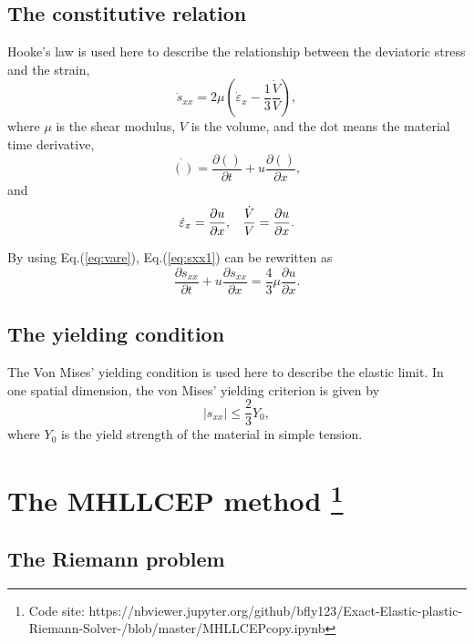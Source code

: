 \documentclass[review]{elsarticle}
\begin{document}
\subsection{The constitutive relation}
Hooke's law is used here to describe the relationship between the deviatoric stress and the strain,
\begin{equation}\label{eq:sxx1}
\dot{s}_{xx} = 2\mu \left(\dot{\varepsilon}_x-\frac{1}{3}\frac{\dot{V}}{V}\right),
\end{equation}
where $\mu$ is the shear modulus, $V$ is the volume, and the dot means the material time derivative,
\begin{equation}\label{eq:mt}
  \dot{()} = \frac{\partial ()}{\partial t} + u \frac{\partial ()}{\partial x},
\end{equation}
and
\begin{equation}\label{eq:vare}
  \dot{\varepsilon}_x = \frac{\partial u}{\partial x}, \hspace{0.3cm} \frac{\dot{V}}{V} = \frac{\partial u}{\partial x}.
\end{equation}

By using Eq.(\ref{eq:vare}), Eq.(\ref{eq:sxx1}) can be rewritten as
\begin{equation}\label{eq:sxx}
  \frac{\partial s_{xx}}{\partial t} + u \frac{\partial s_{xx}}{\partial x} =\frac{4}{3}\mu \frac{\partial u}{\partial x}.
\end{equation}

\subsection{The yielding condition}
The Von Mises' yielding condition is used here to describe the elastic limit. In one spatial dimension, the von Mises' yielding criterion is given by
\begin{equation}
  |s_{xx}| \le \frac{2}{3}Y_0,
\end{equation}
where $Y_0$ is the yield strength of the material in simple tension.

  
\section{The MHLLCEP method  \footnote{Code site: https://nbviewer.jupyter.org/github/bfly123/Exact-Elastic-plastic-Riemann-Solver-/blob/master/MHLLCEPcopy.ipynb}}\label{sec:HLLCEP}
\subsection{The Riemann problem}
\end{document}
